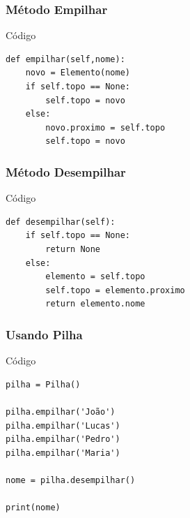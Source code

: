 \documentclass{beamer}
\begin{document}
\begin{frame}[fragile]
\frametitle{Método Empilhar}

\begin{exampleblock}{Código}

\begin{lstlisting}
def empilhar(self,nome):
    novo = Elemento(nome)
    if self.topo == None:
        self.topo = novo
    else:
        novo.proximo = self.topo  
        self.topo = novo
\end{lstlisting}
\end{exampleblock}
\end{frame}

\begin{frame}[fragile]
\frametitle{Método Desempilhar}

\begin{exampleblock}{Código}

\begin{lstlisting}
def desempilhar(self):
    if self.topo == None:
        return None
    else:
        elemento = self.topo
        self.topo = elemento.proximo
        return elemento.nome
\end{lstlisting}
\end{exampleblock}
\end{frame}

\begin{frame}[fragile]
\frametitle{Usando Pilha}

\begin{exampleblock}{Código}

\begin{lstlisting}
pilha = Pilha()

pilha.empilhar('João')
pilha.empilhar('Lucas')
pilha.empilhar('Pedro')
pilha.empilhar('Maria')

nome = pilha.desempilhar()

print(nome)
\end{lstlisting}
\end{exampleblock}
\end{frame}
\end{document}
